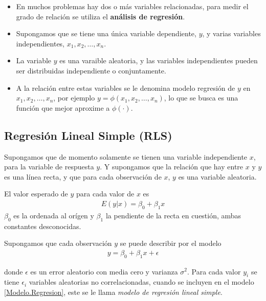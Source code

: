 \begin{Note}
\begin{itemize}
\item En muchos problemas hay dos o m\'as variables relacionadas, para medir el grado de relaci\'on se utiliza el \textbf{an\'alisis de regresi\'on}. 
\item Supongamos que se tiene una \'unica variable dependiente, $y$, y varias  variables independientes, $x_{1},x_{2},\ldots,x_{n}$.

\item  La variable $y$ es una varaible aleatoria, y las variables independientes pueden ser distribuidas independiente o conjuntamente. 

\item A la relaci\'on entre estas variables se le denomina modelo regresi\'on de $y$ en $x_{1},x_{2},\ldots,x_{n}$, por ejemplo $y=\phi\left(x_{1},x_{2},\ldots,x_{n}\right)$, lo que se busca es una funci\'on que mejor aproxime a $\phi\left(\cdot\right)$.

\end{itemize}

\end{Note}





\subsection{Regresi\'on Lineal Simple (RLS)}




Supongamos que de momento solamente se tienen una variable independiente $x$, para la variable de respuesta $y$. Y supongamos que la relaci\'on que hay entre $x$ y $y$ es una l\'inea recta, y que para cada observaci\'on de $x$, $y$ es una variable aleatoria.

El valor esperado de $y$ para cada valor de $x$ es
\begin{eqnarray}
E\left(y|x\right)=\beta_{0}+\beta_{1}x
\end{eqnarray}
$\beta_{0}$ es la ordenada al or\'igen y  $\beta_{1}$ la pendiente de la recta en cuesti\'on, ambas constantes desconocidas. 

Supongamos que cada observaci\'on $y$ se puede describir por el modelo
\begin{eqnarray}\label{Modelo.Regresion}
y=\beta_{0}+\beta_{1}x+\epsilon
\end{eqnarray}

donde $\epsilon$ es un error aleatorio con media cero y varianza $\sigma^{2}$. Para cada valor $y_{i}$ se tiene $\epsilon_{i}$ variables aleatorias no correlacionadas, cuando se incluyen en el modelo \ref{Modelo.Regresion}, este se le llama \textit{modelo de regresi\'on lineal simple}.






